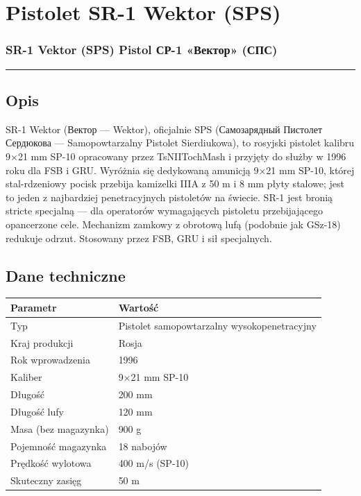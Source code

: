 \documentclass[12pt,openany,oneside]{book}
\begin{document}
\chapter{Pistolet SR-1 Wektor (SPS)}\label{pistolet-sr-1-wektor-sps}

\subsection{SR-1 Vektor (SPS) Pistol \textbar{} СР-1 «Вектор»
(СПС)}\label{sr-1-vektor-sps-pistol-ux441ux440-1-ux432ux435ux43aux442ux43eux440-ux441ux43fux441}

\begin{center}\rule{0.5\linewidth}{0.5pt}\end{center}

\section{Opis}\label{opis-93}

SR-1 Wektor (Вектор --- Wektor), oficjalnie SPS (Самозарядный Пистолет
Сердюкова --- Samopowtarzalny Pistolet Sierdiukowa), to rosyjski
pistolet kalibru 9×21 mm SP-10 opracowany przez TsNIITochMash i przyjęty
do służby w 1996 roku dla FSB i GRU. Wyróżnia się dedykowaną amunicją
9×21 mm SP-10, której stal-rdzeniowy pocisk przebija kamizelki IIIA z 50
m i 8 mm płyty stalowe; jest to jeden z najbardziej penetracyjnych
pistoletów na świecie. SR-1 jest bronią stricte specjalną --- dla
operatorów wymagających pistoletu przebijającego opancerzone cele.
Mechanizm zamkowy z obrotową lufą (podobnie jak GSz-18) redukuje odrzut.
Stosowany przez FSB, GRU i sił specjalnych.

\section{Dane techniczne}\label{dane-techniczne-93}

\begin{longtable}[]{@{}ll@{}}
\toprule\noalign{}
Parametr & Wartość \\
\midrule\noalign{}
\endhead
\bottomrule\noalign{}
\endlastfoot
Typ & Pistolet samopowtarzalny wysokopenetracyjny \\
Kraj produkcji & Rosja \\
Rok wprowadzenia & 1996 \\
Kaliber & 9×21 mm SP-10 \\
Długość & 200 mm \\
Długość lufy & 120 mm \\
Masa (bez magazynka) & 900 g \\
Pojemność magazynka & 18 nabojów \\
Prędkość wylotowa & 400 m/s (SP-10) \\
Skuteczny zasięg & 50 m \\
\end{longtable}
\end{document}
